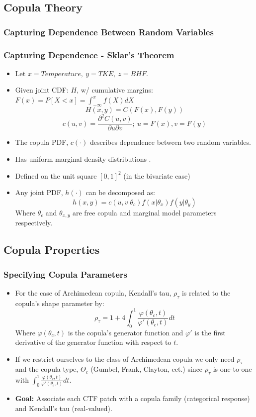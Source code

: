 \documentclass[t, pdftex]{beamer}
\begin{document}
\subsection*{Copula Theory}
\subsubsection*{Capturing Dependence Between Random Variables}
\begin{frame}
\frametitle{Capturing Dependence - Sklar's Theorem}
\vspace{-16.5pt}
\begin{itemize}
\item Let $x=Temperature,\ y=TKE,\ z=BHF$.
\item Given joint CDF: $H$, w/ cumulative margins: $F(x)=P[X < x] = \int_{-\infty}^{x}f(X)dX$
\[
H(x,y) = C(F(x), F(y))
\]
\[
c(u, v) = \frac{\partial^2 C(u, v)}{\partial u \partial v};\ u=F(x), v=F(y)
\]
\item  The copula PDF, $c(\cdot)$ describes dependence between two random variables.
\item  Has uniform marginal density distributions \cite{Nelsen2006}.
\item  Defined on the unit square $[0, 1]^2$ (in the bivariate case)
\item  Any joint PDF, $h(\cdot)$ can be decomposed as: \\
\[
h(x, y) = c(u, v |\theta_c)f(x|\theta_x)f(y|\theta_y)
\]
Where $\theta_c$ and $\theta_{x,y}$ are free copula and marginal model parameters respectively.
\end{itemize}
\end{frame}

\subsection*{Copula Properties}
\begin{frame}[noframenumbering]
\frametitle{Specifying Copula Parameters}
\begin{itemize}
    \item For the case of Archimedean copula, Kendall's tau, $\rho_\tau$ is
    related to the copula's shape parameter by:
    \[
    \rho_\tau = 1 + 4 \int_0^1 \frac{\varphi(\theta_c,t)}{\varphi'(\theta_c, t)}dt
    \]
    Where $\varphi(\theta_c, t)$ is the copula's generator function and $\varphi'$ is the first derivative of the generator function with respect to $t$.
    \item  If we restrict ourselves to the class of  Archimedean copula we only need $\rho_\tau$ and the copula type, $\Theta_c$ (Gumbel, Frank, Clayton, ect.) since $\rho_\tau$ is one-to-one with $\int_0^1 \frac{\varphi(\theta_c,t)}{\varphi'(\theta_c, t)}dt$.
    \item \textbf{Goal:} Associate each CTF patch with a copula family (categorical response) and Kendall's tau (real-valued).
\end{itemize}
\end{frame}
\end{document}
